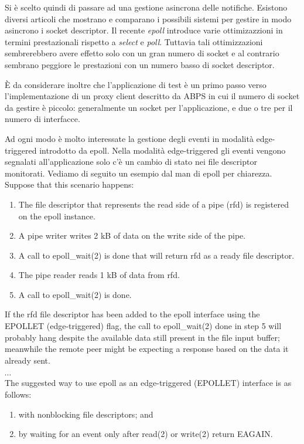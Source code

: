 \documentclass[a4paper,10pt]{article}
\begin{document}
Si è scelto quindi di passare ad una gestione asincrona delle notifiche.
Esistono diversi articoli\cite{polling1,polling2} che mostrano e
comparano i possibili sistemi per gestire in modo asincrono i socket
descriptor.
Il recente \emph{epoll} introduce varie ottimizazzioni in termini
prestazionali rispetto a \emph{select} e \emph{poll}.
Tuttavia tali ottimizzazioni sembrerebbero avere effetto solo con un
gran numero di socket e al contrario sembrano peggiore le prestazioni con
un numero basso di socket descriptor. 

È da considerare inoltre che l'applicazione di test 
è un primo passo verso l'implementazione di un proxy client descritto da
ABPS\cite{abps} in cui il numero di socket da gestire è piccolo:
generalmente un socket per l'applicazione, e due o tre per il numero di
interfacce.

Ad ogni modo è molto interessate la gestione degli eventi in modalità edge-triggered 
introdotto da epoll. Nella modalità edge-triggered gli eventi vengono
segnalati all'applicazione solo c'è un cambio di stato nei file
descriptor monitorati. Vediamo di seguito un esempio dal man di epoll per
chiarezza.\\

Suppose that this scenario happens:

\begin{enumerate}
	\item The file descriptor that represents the read side of a pipe
(rfd) is registered on the epoll instance.
	\item A pipe writer writes 2 kB of data on the write side of the pipe.
	\item A  call  to  epoll\_wait(2)  is  done  that  will return rfd as a ready file
          descriptor.
	\item The pipe reader reads 1 kB of data from rfd.
	\item A call to epoll\_wait(2) is done.
\end{enumerate}
If the rfd file descriptor has been added to the  epoll  interface  using  the
EPOLLET  (edge-triggered)  flag, the call to epoll\_wait(2) done in step 5 will
probably hang despite the available data still present in the file input  buffer; 
meanwhile the remote peer might be expecting a response based on the data
it already sent.

$\cdots$\\
The suggested way  to  use  epoll  as  an
edge-triggered (EPOLLET) interface is as follows:
\begin{enumerate}[i]
	\item  with nonblocking file descriptors; and
    \item  by  waiting  for  an  event  only  after read(2) or write(2) return
                  EAGAIN.
\end{enumerate}
\end{document}

